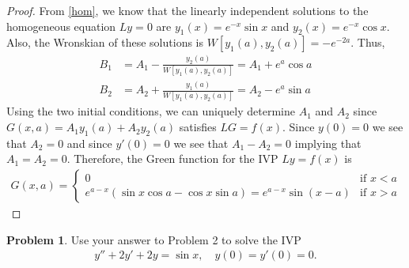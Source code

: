 \documentclass[12pt]{article}
\theoremstyle{definition}
\newtheorem{problem}{Problem}
\begin{document}
\begin{proof}
  From \eqref{hom}, we know that the linearly independent solutions to the
  homogeneous equation $Ly = 0$ are $y_1(x) = e^{-x}\sin x$ and $y_2(x) = e^{-x}\cos x$.
  Also, the Wronskian of these solutions is $W[y_1(a), y_2(a)] = -e^{-2a}$. Thus,
  \begin{align*}
    B_1 &= A_1 - \frac{y_2(a)}{W[y_1(a),y_2(a)]} = A_1 + e^{a}\cos a \\
    B_2 &= A_2 + \frac{y_1(a)}{W[y_1(a),y_2(a)]} = A_2 - e^{a}\sin a
  \end{align*}
  Using the two initial conditions, we can uniquely determine $A_1$ and $A_2$
  since $G(x, a) = A_1y_1(a) + A_2y_2(a)$ satisfies $LG = f(x)$. Since $y(0) = 0$
  we see that $A_2 = 0$ and since $y'(0) = 0$ we see that $A_1 - A_2 = 0$ implying that
  $A_1 = A_2 = 0$. Therefore, the Green function for the IVP $Ly = f(x)$ is
  \begin{align}\label{green}
    G(x, a) =
    \begin{cases}
      0 & \text{if $x < a$} \\
      e^{a-x}\left(\sin x\cos a  - \cos x \sin a \right) = e^{a-x}\sin(x-a) & \text{if $x > a$}
    \end{cases}
  \end{align}
\end{proof}
\newpage


\begin{problem}
  Use your answer to Problem 2 to solve the IVP
  \begin{align*}
    y'' + 2y' + 2y = \sin x, \quad y(0) = y'(0) = 0.
  \end{align*}
\end{problem}
\end{document}
